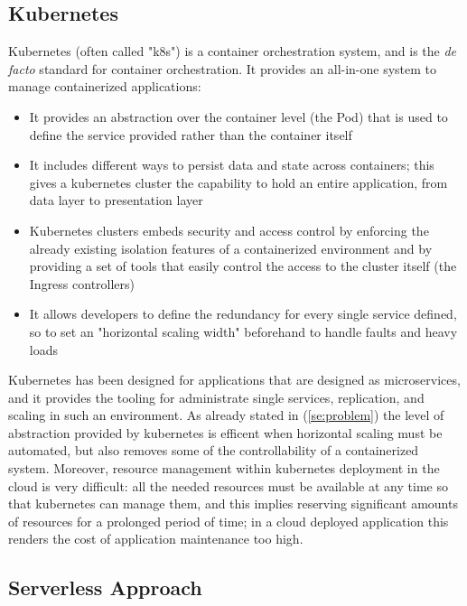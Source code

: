 \subsection{Kubernetes}
\label{sse:kubernetes}
  Kubernetes (often called "k8s") is a container orchestration system, and is the \textit{de facto} standard for container orchestration. It provides an all-in-one system to manage containerized applications:
  \begin{itemize}
    \item It provides an abstraction over the container level (the Pod) that is used to define the service provided rather than the container itself
    \item It includes different ways to persist data and state across containers; this gives a kubernetes cluster the capability to hold an entire application, from data layer to presentation layer
    \item Kubernetes clusters embeds security and access control by enforcing the already existing isolation features of a containerized environment and by providing a set of tools that easily control the access to the cluster itself (the Ingress controllers)
    \item It allows developers to define the redundancy for every single service defined, so to set an "horizontal scaling width" beforehand to handle faults and heavy loads
  \end{itemize}
  Kubernetes has been designed for applications that are designed as microservices, and it provides the tooling for administrate single services, replication, and scaling in such an environment. As already stated in (\ref{se:problem}) the level of abstraction provided by kubernetes is efficent when horizontal scaling must be automated, but also removes some of the controllability of a containerized system. Moreover, resource management within kubernetes deployment in the cloud is very difficult: all the needed resources must be available at any time so that kubernetes can manage them, and this implies reserving significant amounts of resources for a prolonged period of time; in a cloud deployed application this renders the cost of application maintenance too high. 

\subsection{Serverless Approach}
\label{sse:serverless}


